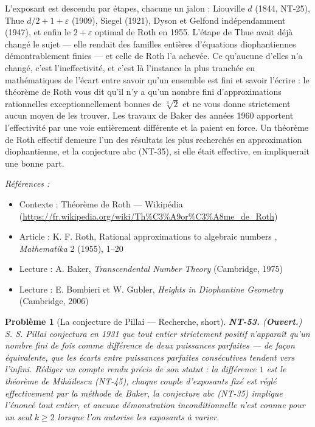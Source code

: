 \documentclass[11pt]{article}
\newtheorem{problem}{Problème}
\newenvironment{refs}{\par\small\noindent\emph{Références :}\begin{itemize}\setlength\itemsep{0pt}}{\end{itemize}\normalsize}
\begin{document}
\noindent L'exposant est descendu par étapes, chacune un jalon : Liouville
$ d $ (1844, NT-25), Thue $ d/2 + 1 + \varepsilon $ (1909), Siegel (1921), Dyson et
Gelfond indépendamment (1947), et enfin le $ 2 + \varepsilon $ optimal de Roth en 1955. L'étape de
Thue avait déjà changé le sujet --- elle rendait des familles entières d'équations diophantiennes
démontrablement finies --- et celle de Roth l'a achevée. Ce qu'aucune d'elles n'a changé, c'est
l'ineffectivité, et c'est là l'instance la plus tranchée en mathématiques de l'écart entre savoir
qu'un ensemble est fini et savoir l'écrire : le théorème de Roth vous dit qu'il n'y a qu'un nombre
fini d'approximations rationnelles exceptionnellement bonnes de $ \sqrt[3]{2} $ et ne vous donne
strictement aucun moyen de les trouver. Les travaux de Baker des années 1960 apportent l'effectivité
par une voie entièrement différente et la paient en force. Un théorème de Roth effectif demeure l'un
des résultats les plus recherchés en approximation diophantienne, et la conjecture abc (NT-35), si
elle était effective, en impliquerait une bonne part.

\begin{refs}
\item Contexte : Théorème de Roth --- Wikipédia (\url{https://fr.wikipedia.org/wiki/Th%C3%A9or%C3%A8me_de_Roth})
\item Article : K. F. Roth, \og{} Rational approximations to algebraic numbers \fg{}, \textit{Mathematika} 2 (1955), 1--20
\item Lecture : A. Baker, \textit{Transcendental Number Theory} (Cambridge, 1975)
\item Lecture : E. Bombieri et W. Gubler, \textit{Heights in Diophantine Geometry} (Cambridge, 2006)
\end{refs}

\bigskip

\begin{problem}[{La conjecture de Pillai --- Recherche, short}]
\textbf{NT-53.} (\textbf{Ouvert.}) S. S. Pillai conjectura en 1931 que tout
entier strictement positif n'apparaît qu'un nombre fini de fois comme différence de deux puissances
parfaites --- de façon équivalente, que les écarts entre puissances parfaites consécutives tendent vers
l'infini. Rédiger un compte rendu précis de son statut : la différence $ 1 $ est le théorème de
Mih\u{a}ilescu (NT-45), chaque couple d'exposants fixé est réglé effectivement par la méthode de Baker,
la conjecture abc (NT-35) implique l'énoncé tout entier, et aucune démonstration inconditionnelle
n'est connue pour un seul $ k \ge 2 $ lorsque l'on autorise les exposants à varier.
\end{problem}
\end{document}
